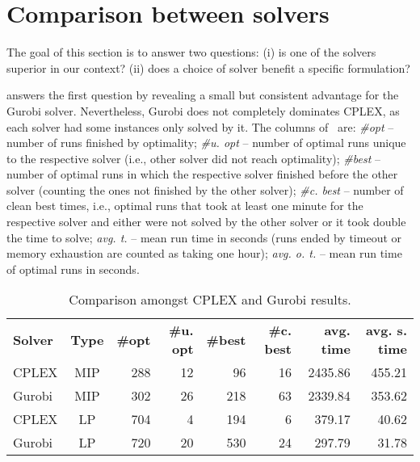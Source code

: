 \section{Comparison between solvers}
\label{sec:results_comparing_solvers}

The goal of this section is to answer two questions:
(i) is one of the solvers superior in our context?
(ii) does a choice of solver benefit a specific formulation?

 answers the first question by revealing a small but consistent advantage for the Gurobi solver.
Nevertheless, Gurobi does not completely dominates CPLEX, as each solver had some instances only solved by it.
The columns of~ are:
\emph{\#opt} -- number of runs finished by optimality;
\emph{\#u. opt} -- number of optimal runs unique to the respective solver (i.e., other solver did not reach optimality);
\emph{\#best} -- number of optimal runs in which the respective solver finished before the other solver (counting the ones not finished by the other solver);
\emph{\#c. best} -- number of clean best times, i.e., optimal runs that took at least one minute for the respective solver and either were not solved by the other solver or it took double the time to solve;
\emph{avg. t.} -- mean run time in seconds (runs ended by timeout or memory exhaustion are counted as taking one hour);
\emph{avg. o. t.} -- mean run time of optimal runs in seconds.

\begin{table}[h]
  \center
  \caption{Comparison amongst CPLEX and Gurobi results.}
  \setlength{}
  \begin{tabular}{lcrrrrrr}
    \hline\hline
    \textbf{Solver} & \textbf{Type} & \textbf{\#opt} & \textbf{\#u. opt} & \textbf{\#best} & \textbf{\#c. best} & \textbf{avg. time} & \textbf{avg. s. time} \\\cmidrule(lr){1-2}\cmidrule(lr){3-8}
     CPLEX & MIP & 288 & 12 &  96 & 16 & 2435.86 & 455.21 \\
    Gurobi & MIP & 302 & 26 & 218 & 63 & 2339.84 & 353.62 \\
     CPLEX & LP  & 704 &  4 & 194 &  6 &  379.17 &  40.62 \\
    Gurobi & LP  & 720 & 20 & 530 & 24 &  297.79 &  31.78 \\\hline\hline
  \end{tabular}
  \label{tab:cplex_vs_gurobi}
\end{table}

